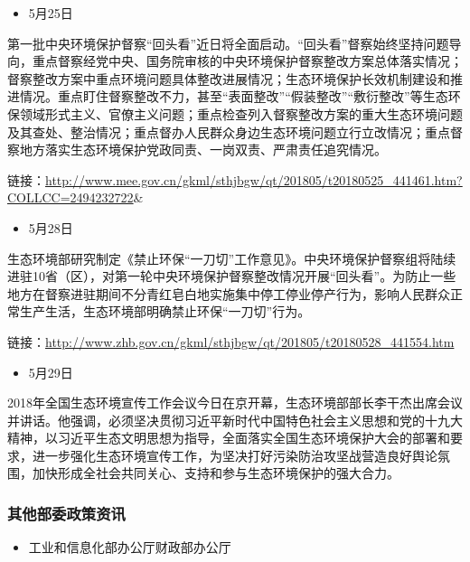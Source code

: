 \documentclass[]{book}
\providecommand{\tightlist}{%
  \setlength{\itemsep}{0pt}\setlength{\parskip}{0pt}}
\begin{document}
\begin{itemize}
\tightlist
\item
  5月25日
\end{itemize}

第一批中央环境保护督察``回头看''近日将全面启动。``回头看''督察始终坚持问题导向，重点督察经党中央、国务院审核的中央环境保护督察整改方案总体落实情况；督察整改方案中重点环境问题具体整改进展情况；生态环境保护长效机制建设和推进情况。重点盯住督察整改不力，甚至``表面整改''``假装整改''``敷衍整改''等生态环保领域形式主义、官僚主义问题；重点检查列入督察整改方案的重大生态环境问题及其查处、整治情况；重点督办人民群众身边生态环境问题立行立改情况；重点督察地方落实生态环境保护党政同责、一岗双责、严肃责任追究情况。

链接：\url{http://www.mee.gov.cn/gkml/sthjbgw/qt/201805/t20180525_441461.htm?COLLCC=2494232722}\&

\begin{itemize}
\tightlist
\item
  5月28日
\end{itemize}

生态环境部研究制定《禁止环保``一刀切''工作意见》。中央环境保护督察组将陆续进驻10省（区），对第一轮中央环境保护督察整改情况开展``回头看''。为防止一些地方在督察进驻期间不分青红皂白地实施集中停工停业停产行为，影响人民群众正常生产生活，生态环境部明确禁止环保``一刀切''行为。

链接：\url{http://www.zhb.gov.cn/gkml/sthjbgw/qt/201805/t20180528_441554.htm}

\begin{itemize}
\tightlist
\item
  5月29日
\end{itemize}

2018年全国生态环境宣传工作会议今日在京开幕，生态环境部部长李干杰出席会议并讲话。他强调，必须坚决贯彻习近平新时代中国特色社会主义思想和党的十九大精神，以习近平生态文明思想为指导，全面落实全国生态环境保护大会的部署和要求，进一步强化生态环境宣传工作，为坚决打好污染防治攻坚战营造良好舆论氛围，加快形成全社会共同关心、支持和参与生态环境保护的强大合力。

\subsubsection*{其他部委政策资讯}\label{-1}

\begin{itemize}
\tightlist
\item
  工业和信息化部办公厅财政部办公厅
\end{itemize}
\end{document}
